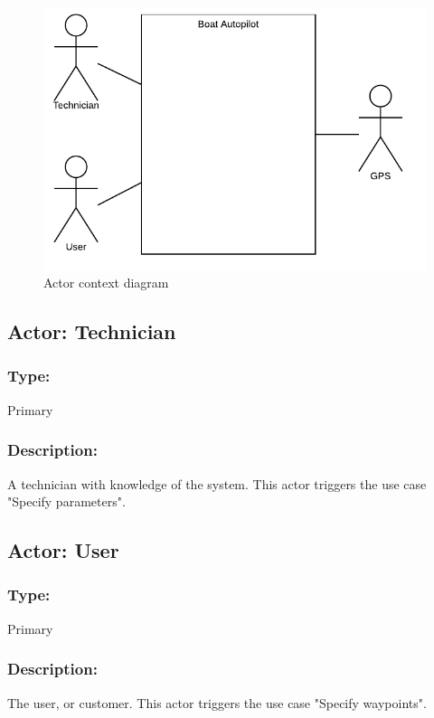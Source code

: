 \begin{figure}[H]
	\centering
	\includegraphics{Images/Requirements_specification/Actor_context_diagram}
	\caption{Actor context diagram}
	\label{fig:actor}
\end{figure}

\begin{framed}
	\subsection{Actor: Technician}
	\subsubsection*{Type:}
	Primary
	
	\subsubsection*{Description:}
	A technician with knowledge of the system. This actor triggers the use case "Specify parameters".
	
\end{framed}

\begin{framed}
	\subsection{Actor: User}
		\subsubsection*{Type:}
			Primary
	
		\subsubsection*{Description:}
			The user, or customer. This actor triggers the use case "Specify waypoints".
\end{framed}

